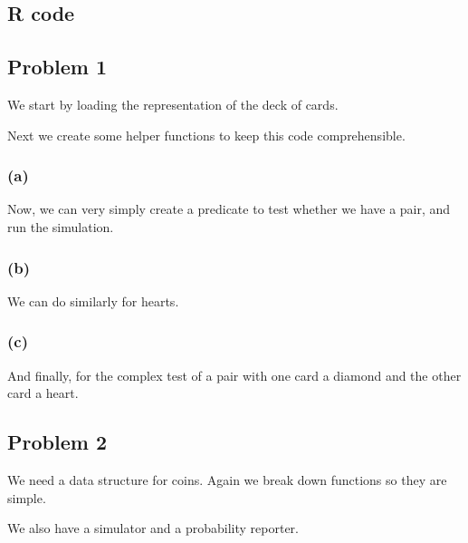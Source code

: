 \begin{appendices}
    \section{R code}

        \subsection*{Problem 1}
            We start by loading the representation of the deck of cards.


            Next we create some helper functions to keep this code comprehensible.


            \subsubsection*{(a)}

                Now, we can very simply create a predicate to test whether we have a pair, and run the simulation.


            \subsubsection*{(b)}

                We can do similarly for hearts.


            \subsubsection*{(c)}

                And finally, for the complex test of a pair with one card a diamond and the other card a heart.


        \subsection*{Problem 2}
            We need a data structure for coins.
            Again we break down functions so they are simple.

            We also have a simulator and a probability reporter.


\end{appendices}
